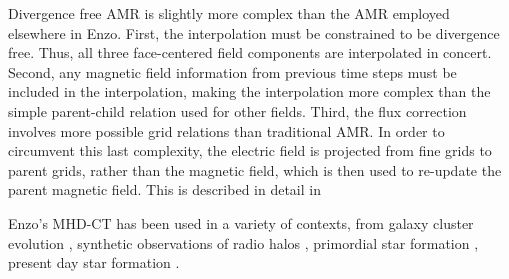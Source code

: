 Divergence free AMR is slightly more complex than the AMR employed elsewhere in
Enzo.  First, the interpolation must be constrained to be divergence free.
Thus, all three face-centered field components are interpolated in concert.
Second, any magnetic field information from previous time steps must be included
in the interpolation, making the interpolation more complex than the simple
parent-child relation used for other fields.  Third, the flux correction
involves more possible grid relations than traditional AMR.  In order to
circumvent this last complexity, the electric field is projected from fine grids
to parent grids, rather than the magnetic field, which is then used to re-update
the parent magnetic field.  This is described in detail in \citet{Balsara99,
Collins10}

Enzo's MHD-CT has been used in a variety of contexts, from galaxy cluster
evolution \citep{Xu11,Xu12}, synthetic observations of radio halos
\citep{Skillman13},  primordial star formation \citep{Xu08}, 
present day star formation \citep{Collins11,Collins12}.  

